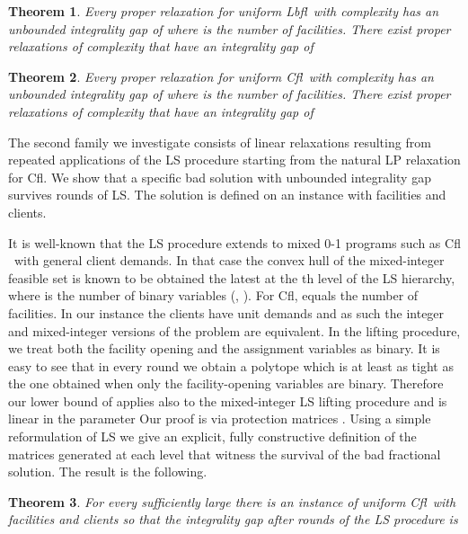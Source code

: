 \documentclass[11pt]{article}\usepackage{amsmath}
\newtheorem{theorem}{Theorem}[section]
\newcommand{\lbfl}{{\sc Lbfl}}
\newcommand{\cfl}{{\sc Cfl}}
\begin{document}
\begin{theorem}
\label{theorem:proper}
Every proper relaxation for uniform \lbfl\ with complexity  has an
unbounded integrality gap of  where  is the number of
facilities. There exist proper relaxations of complexity  that have an
integrality gap of  
\end{theorem}

\begin{theorem}
\label{theorem:proper2}
Every proper relaxation for uniform \cfl\ with complexity  has an
unbounded integrality gap of  where  is the number of
facilities. There exist proper relaxations of complexity  that have an
integrality gap of  
\end{theorem}


The second family we investigate consists of  linear  relaxations resulting from
repeated applications of the 
LS procedure starting from the natural LP relaxation for  \cfl\/.
We show that a specific bad solution with unbounded integrality gap 
 survives  rounds of LS.
The solution is defined on an instance  
 with  facilities and  
clients.    



It is  well-known that the LS procedure 
 extends to mixed 0-1  programs \cite{LovaszS91,BalasCC93} such as  \cfl
 \ with general client demands.  In that case the convex hull of the
 mixed-integer feasible set is known to be obtained the latest at the th
 level of the LS hierarchy, where  is the number of binary variables
 (\cite{LovaszS91},  \cite[Theorem~2.6]{BalasCC93}). For  \cfl,   
 equals the number  of facilities. 
In our instance 
 the clients have unit demands and as such the integer and
mixed-integer versions of the problem are 
equivalent. 
 In the lifting procedure, we treat  both the facility opening and the assignment
 variables as binary. 
It is easy to see that in  every round we obtain a polytope which is at least as tight as the one obtained 
when only the facility-opening variables are binary. 
 Therefore  our lower bound of   applies also 
 to the mixed-integer LS lifting procedure and is linear in the parameter  
Our proof is via protection matrices \cite{LovaszS91}. 
Using a simple reformulation of LS we give an explicit, fully
constructive definition of the matrices generated at each level that
witness the survival of the bad  fractional solution. 
The result is the following. 

\begin{theorem}
\label{theorem:ls-cfl}
For every sufficiently large   
there is an instance of uniform \cfl \   with  facilities and  clients 
so that the integrality gap 
 after  rounds of the LS procedure is    
\end{theorem}
\end{document}

